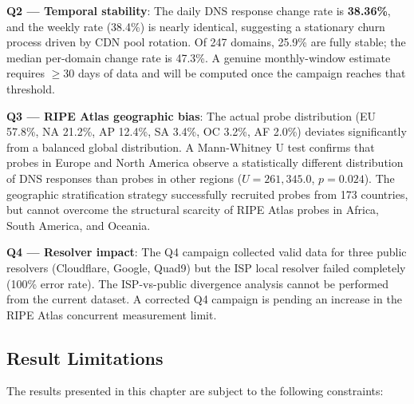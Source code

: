 \textbf{Q2 --- Temporal stability}: The daily DNS response change rate is \textbf{38.36\%}, and the weekly rate (38.4\%) is nearly identical, suggesting a stationary churn process driven by CDN pool rotation. Of 247 domains, 25.9\% are fully stable; the median per-domain change rate is 47.3\%. A genuine monthly-window estimate requires $\geq 30$ days of data and will be computed once the campaign reaches that threshold.

\textbf{Q3 --- RIPE Atlas geographic bias}: The actual probe distribution (EU 57.8\%, NA 21.2\%, AP 12.4\%, SA 3.4\%, OC 3.2\%, AF 2.0\%) deviates significantly from a balanced global distribution. A Mann-Whitney U test confirms that probes in Europe and North America observe a statistically different distribution of DNS responses than probes in other regions ($U = 261{,}345.0$, $p = 0.024$). The geographic stratification strategy successfully recruited probes from 173 countries, but cannot overcome the structural scarcity of RIPE Atlas probes in Africa, South America, and Oceania.

\textbf{Q4 --- Resolver impact}: The Q4 campaign collected valid data for three public resolvers (Cloudflare, Google, Quad9) but the ISP local resolver failed completely (100\% error rate). The ISP-vs-public divergence analysis cannot be performed from the current dataset. A corrected Q4 campaign is pending an increase in the RIPE Atlas concurrent measurement limit.

\subsection{Result Limitations}
\label{subsec:4.6.2}

The results presented in this chapter are subject to the following constraints:

